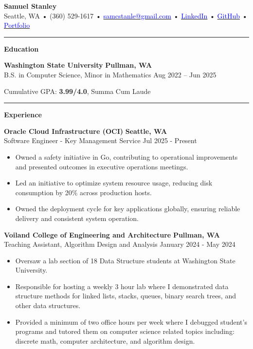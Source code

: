 \documentclass[10pt]{article}
\newcommand{\resumesection}[1]{
  \vspace{-5pt}
  \noindent\rule{\linewidth}{0.4pt}
  \par
  {\centering\large\bfseries #1\par}
  \vspace{2pt}
}
\newcommand{\resumeentry}[4]{%
    \textbf{#1} \hfill \textbf{#2} \\
    #3 \hfill #4%
    \vspace{2pt}%
}
\newcommand{\nicelink}[2]{%
    \href{#1}{\textcolor{blue}{#2}}%
}
\begin{document}
    {\centering
        {\LARGE \textbf{Samuel Stanley}} \\[-1pt]
        Seattle, WA • 
        (360) 529-1617 • 
        \nicelink{mailto:samcstanle@gmail.com}{samcstanle@gmail.com} • 
        \nicelink{https://www.linkedin.com/in/samuel-stanley-1ba48b24a/}{LinkedIn} • 
        \nicelink{https://github.com/SamStan4}{GitHub} • 
        \nicelink{http://www.samstanley.org/}{Portfolio}
    \par}

    \resumesection{Education}

    \resumeentry
    {Washington State University}
    {Pullman, WA}
    {B.S. in Computer Science, Minor in Mathematics}
    {Aug 2022 -- Jun 2025}

    Cumulative GPA: \textbf{3.99/4.0}, Summa Cum Laude


    \resumesection{Experience}

    \resumeentry
    {Oracle Cloud Infrastructure (OCI)}
    {Seattle, WA}
    {Software Engineer - Key Management Service}
    {Jul 2025 - Present}

    \begin{itemize}
        \item Owned a safety initiative in Go, contributing to operational improvements and presented outcomes in executive operations meetings.
        \item Led an initiative to optimize system resource usage, reducing disk consumption by 20\% across production hosts.
        \item Owned the deployment cycle for key applications globally, ensuring reliable delivery and consistent system operation.
    \end{itemize}

    \resumeentry
    {Voiland College of Engineering and Architecture}
    {Pullman, WA}
    {Teaching Assistant, Algorithm Design and Analysis}
    {January 2024 - May 2024}

    \begin{itemize}
        \item Oversaw a lab section of 18 Data Structure students at Washington State University.
        \item Responsible for hosting a weekly 3 hour lab where I demonstrated data structure methods for linked lists, stacks, queues, binary search trees, and other data structures.
        \item Provided a minimum of two office hours per week where I debugged student’s programs and tutored them on computer science related topics including: discrete math, computer architecture, and algorithm design.
    \end{itemize}
\end{document}
